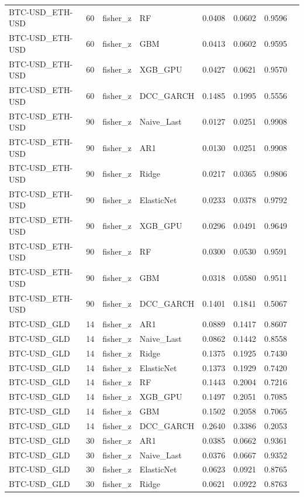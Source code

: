 \begin{table}[H]
\begin{tabular}{llllrrrr}
BTC-USD_ETH-USD & 60 & fisher_z & RF & 0.0408 & 0.0602 & 0.9596 &  \\
BTC-USD_ETH-USD & 60 & fisher_z & GBM & 0.0413 & 0.0602 & 0.9595 &  \\
BTC-USD_ETH-USD & 60 & fisher_z & XGB_GPU & 0.0427 & 0.0621 & 0.9570 &  \\
BTC-USD_ETH-USD & 60 & fisher_z & DCC_GARCH & 0.1485 & 0.1995 & 0.5556 &  \\
BTC-USD_ETH-USD & 90 & fisher_z & Naive_Last & 0.0127 & 0.0251 & 0.9908 &  \\
BTC-USD_ETH-USD & 90 & fisher_z & AR1 & 0.0130 & 0.0251 & 0.9908 &  \\
BTC-USD_ETH-USD & 90 & fisher_z & Ridge & 0.0217 & 0.0365 & 0.9806 &  \\
BTC-USD_ETH-USD & 90 & fisher_z & ElasticNet & 0.0233 & 0.0378 & 0.9792 &  \\
BTC-USD_ETH-USD & 90 & fisher_z & XGB_GPU & 0.0296 & 0.0491 & 0.9649 &  \\
BTC-USD_ETH-USD & 90 & fisher_z & RF & 0.0300 & 0.0530 & 0.9591 &  \\
BTC-USD_ETH-USD & 90 & fisher_z & GBM & 0.0318 & 0.0580 & 0.9511 &  \\
BTC-USD_ETH-USD & 90 & fisher_z & DCC_GARCH & 0.1401 & 0.1841 & 0.5067 &  \\
BTC-USD_GLD & 14 & fisher_z & AR1 & 0.0889 & 0.1417 & 0.8607 &  \\
BTC-USD_GLD & 14 & fisher_z & Naive_Last & 0.0862 & 0.1442 & 0.8558 &  \\
BTC-USD_GLD & 14 & fisher_z & Ridge & 0.1375 & 0.1925 & 0.7430 &  \\
BTC-USD_GLD & 14 & fisher_z & ElasticNet & 0.1373 & 0.1929 & 0.7420 &  \\
BTC-USD_GLD & 14 & fisher_z & RF & 0.1443 & 0.2004 & 0.7216 &  \\
BTC-USD_GLD & 14 & fisher_z & XGB_GPU & 0.1497 & 0.2051 & 0.7085 &  \\
BTC-USD_GLD & 14 & fisher_z & GBM & 0.1502 & 0.2058 & 0.7065 &  \\
BTC-USD_GLD & 14 & fisher_z & DCC_GARCH & 0.2640 & 0.3386 & 0.2053 &  \\
BTC-USD_GLD & 30 & fisher_z & AR1 & 0.0385 & 0.0662 & 0.9361 &  \\
BTC-USD_GLD & 30 & fisher_z & Naive_Last & 0.0376 & 0.0667 & 0.9352 &  \\
BTC-USD_GLD & 30 & fisher_z & ElasticNet & 0.0623 & 0.0921 & 0.8765 &  \\
BTC-USD_GLD & 30 & fisher_z & Ridge & 0.0621 & 0.0922 & 0.8763 &  \\

\end{tabular}
\end{table}
